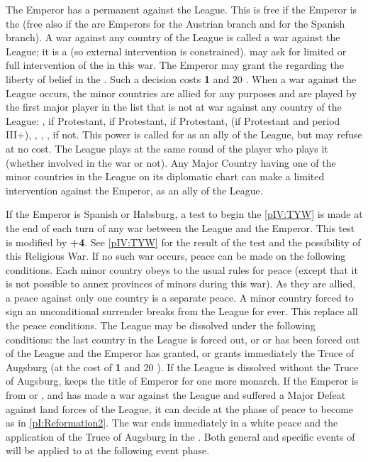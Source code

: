 \phdipl
\aparag The Emperor has a permanent \CB against the League. This \CB is free
if the Emperor is the \SDCF (free \CB also if the \HAB are Emperors for the
Austrian branch and \SDCF for the Spanish branch). A war against any country
of the League is called a war against the League; it is a  (so external intervention is constrained).
\bparag \SPA may ask for limited or full intervention of the \HAB in this war.
\aparag The Emperor may grant the  regarding the
liberty of belief in the \HRE. Such a decision costs {\bf 1} \STAB and 20 \VP.
\aparag When a war against the League occurs, the minor countries are allied
for any purposes and are played by the first major player in the list that is
not at war against any country of the League: \HOL, \ENG if Protestant, \FRA
if Protestant, \POL if Protestant, \SUE (if Protestant and period III+), \SPA,
\ENG, \FRA, \POL if not. This power is called for as an ally of the League,
but may refuse at no cost. The League plays at the same round of the player
who plays it (whether involved in the war or not).
\aparag Any Major Country having one of the minor countries in the League on
its diplomatic chart can make a limited intervention against the Emperor, as
an ally of the League.

\phpaix
\aparag If the Emperor is Spanish or Habsburg, a test to begin the
\ref{pIV:TYW} is made at the end of each turn of any war between the League
and the Emperor. This test is modified by {\bf +4}. See \ref{pIV:TYW} for the
result of the test and the possibility of this Religious War. If no such war
occurs, peace can be made on the following conditions.
\aparag Each minor country obeys to the usual rules for peace (except that it
is not possible to annex provinces of minors during this war). As they are
allied, a peace against only one country is a separate peace.
\aparag A minor country forced to sign an unconditional surrender breaks from
the League for ever. This replace all the peace conditions.
\aparag The League may be dissolved under the following conditions:
\bparag the last country in the League is forced out, or
\bparag \paysHesse or \paysSaxe has been forced out of the League and the
Emperor has granted, or grants immediately the Truce of Augsburg (at the cost
of {\bf 1} \STAB and 20 \PV).
\aparag If the League is dissolved without the Truce of Augsburg, \SPA keeps
the title of Emperor for one more monarch.
\bparag If the Emperor is from \SPA or \HAB, and has made a war against the
League and suffered a Major Defeat against land forces of the League, it can
decide at the phase of peace to become \CATHCO as in
\ref{pI:Reformation2}. The war ends immediately in a white peace and the
application of the Truce of Augsburg in the \HRE. Both general and specific
events of  will be applied to \SPA at the following
event phase.

